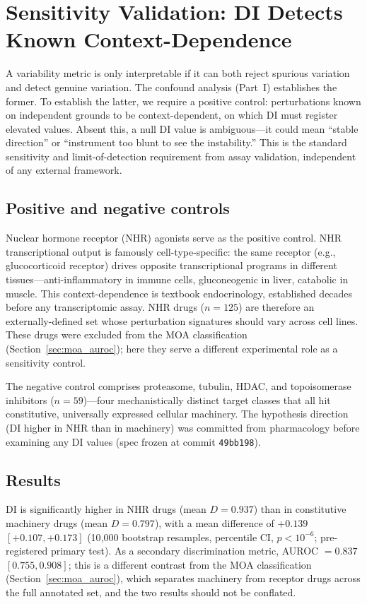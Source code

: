\documentclass[11pt]{article}
\begin{document}
\section{Sensitivity Validation: DI Detects Known Context-Dependence}
\label{sec:sensitivity}

A variability metric is only interpretable if it can both reject
spurious variation and detect genuine variation. The confound analysis
(Part~I) establishes the former. To establish the latter, we require a
positive control: perturbations known on independent grounds to be
context-dependent, on which DI must register elevated values. Absent
this, a null DI value is ambiguous---it could mean ``stable direction''
or ``instrument too blunt to see the instability.'' This is the standard
sensitivity and limit-of-detection requirement from assay validation,
independent of any external framework.

\subsection{Positive and negative controls}

Nuclear hormone receptor (NHR) agonists serve as the positive control.
NHR transcriptional output is famously cell-type-specific: the same
receptor (e.g., glucocorticoid receptor) drives opposite transcriptional
programs in different tissues---anti-inflammatory in immune cells,
gluconeogenic in liver, catabolic in muscle. This context-dependence is
textbook endocrinology, established decades before any transcriptomic
assay. NHR drugs ($n = 125$) are therefore an externally-defined set
whose perturbation signatures should vary across cell lines. These drugs
were excluded from the MOA classification (Section~\ref{sec:moa_auroc});
here they serve a different experimental role as a sensitivity control.

The negative control comprises proteasome, tubulin, HDAC, and
topoisomerase inhibitors ($n = 59$)---four mechanistically distinct
target classes that all hit constitutive, universally expressed cellular
machinery. The hypothesis direction (DI higher in NHR than in
machinery) was committed from pharmacology before examining any DI
values (spec frozen at commit \texttt{49bb198}).

\subsection{Results}

DI is significantly higher in NHR drugs (mean $D = 0.937$) than in
constitutive machinery drugs (mean $D = 0.797$), with a mean
difference of $+0.139$ $[+0.107, +0.173]$ (10{,}000 bootstrap
resamples, percentile CI, $p < 10^{-6}$; pre-registered primary test).
As a secondary discrimination metric, AUROC $= 0.837$ $[0.755, 0.908]$;
this is a different contrast from the MOA classification
(Section~\ref{sec:moa_auroc}), which separates machinery from receptor
drugs across the full annotated set, and the two results should not be
conflated.
\end{document}
